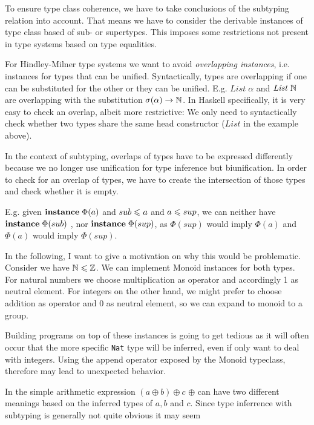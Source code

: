 To ensure type class coherence, we have to take conclusions of the subtyping relation into account.
That means we have to consider the derivable instances of type class based of sub- or supertypes.
This imposes some restrictions not present in type systems based on type equalities.

For Hindley-Milner type systems we want to avoid \emph{overlapping instances}, i.e. instances for types that can be unified. \cite{peytonjones1997type}
Syntactically, types are overlapping if one can be substituted for the other or they can be unified.
E.g. $\mathit{List} \; \alpha$ and $\mathit{List} \; \mathbb{N}$ are overlapping with the substitution $\sigma(\alpha) \to \mathbb{N}$.
In Haskell specifically, it is very easy to check an overlap, albeit more restrictive: We only need to syntactically check whether two types share the same head constructor ($\mathit{List}$ in the example above).

In the context of subtyping, overlaps of types have to be expressed differently because we no longer use unification for type inference but biunification.
In order to check for an overlap of types, we have to create the intersection of those types and check whether it is empty.

E.g. given ${\bf instance} \; \Phi(a)$ and $sub \leqslant a$ and $a \leqslant sup$, we can neither have ${\bf instance} \; \Phi(sub)$ , nor ${\bf instance} \; \Phi(sup)$,
as $\Phi(sup)$ would imply $\Phi(a)$ and $\Phi(a)$ would imply $\Phi(sup)$.

In the following, I want to give a motivation on why this would be problematic.
Consider we have $\mathbb{N} \leqslant \mathbb{Z}$.
We can implement Monoid instances for both types. For natural numbers we choose multiplication as operator and accordingly 1 as neutral element.
For integers on the other hand, we might prefer to choose addition as operator and 0 as neutral element, so we can expand to monoid to a group.

Building programs on top of these instances is going to get tedious as it will often occur that the more specific \texttt{Nat} type will be inferred,
even if only want to deal with integers.
Using the append operator exposed by the Monoid typeclass, therefore may lead to unexpected behavior.

In the simple arithmetic expression $(a \oplus b) \oplus c$ $\oplus$ can have two different meanings based on the inferred types of $a,b$ and $c$.
Since type inferrence with subtyping is generally not quite obvious it may seem

